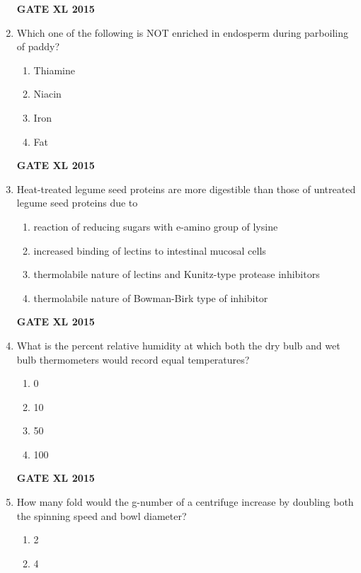 \documentclass[journal,12pt,onecolumn]{IEEEtran}
\begin{document}
\begin{enumerate}
\begin{flushright}\textbf{GATE XL 2015}\end{flushright}
\item Which one of the following is NOT enriched in endosperm during parboiling of paddy?
    \begin{enumerate}
            \item Thiamine
	    \item Niacin
	    \item Iron
            \item Fat
    \end{enumerate}
\begin{flushright}\textbf{GATE XL 2015}\end{flushright}
\item Heat-treated legume seed proteins are more digestible than those of untreated legume seed proteins due to
    \begin{enumerate}
            \item reaction of reducing sugars with e-amino group of lysine
	    \item increased binding of lectins to intestinal mucosal cells
	    \item thermolabile nature of lectins and Kunitz-type protease inhibitors 
            \item thermolabile nature of Bowman-Birk type of inhibitor
    \end{enumerate}
\begin{flushright}\textbf{GATE XL 2015}\end{flushright}
\item What is the percent relative humidity at which both the dry bulb and wet bulb thermometers would record equal temperatures?
    \begin{enumerate}
            \item 0
	    \item 10
	    \item 50
            \item 100
    \end{enumerate}
\begin{flushright}\textbf{GATE XL 2015}\end{flushright}
\item How many fold would the g-number of a centrifuge increase by doubling both the spinning speed and bowl diameter?
    \begin{enumerate}
            \item 2
	    \item 4

\end{enumerate}
\end{enumerate}
\end{document}
